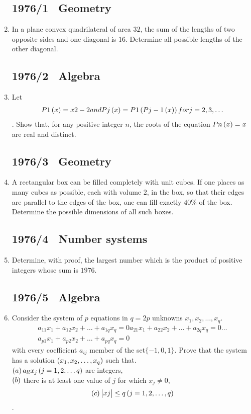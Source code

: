\documentclass{article}
\begin{document}
\begin{enumerate}
		\subsection*{1976/1 \ Geometry}
	\item In a plane convex quadrilateral of area $32$, the sum of the lengths of two opposite sides and one diagonal is $16$. Determine all possible lengths of the other diagonal.
\subsection*{1976/2 \ Algebra}
	\item Let\begin{align} P1\left(x\right) = x2 - 2 and Pj\left(x\right) = P1\left(Pj-1\left(x\right)\right) for j = 2, 3, \ldots \end{align}. Show that, for any positive integer $n$, the roots of the equation $Pn\left(x\right) = x$ are real and distinct.
\subsection*{1976/3 \ Geometry}
		\item A rectangular box can be filled completely with unit cubes. If one places as many cubes as possible, each with volume $2$, in the box, so that their edges are parallel to the edges of the box, one can fill exactly $40\%$ of the box. Determine the possible dimensions of all such boxes.
\subsection*{1976/4 \ Number systems}
		\item Determine, with proof, the largest number which is the product of positive integers whose sum is $1976$.
\subsection*{1976/5 \ Algebra}
		\item Consider the system of $p$ equations in $q = 2p$ unknowns $x_{1}, x_{2}, \ldots, x_{q} $.
			\begin{align}a_{11}x_{1} + a_{12}x_{2} +\ldots + a_{1q}x_{q} = 0 a_{21}x_{1} + a_{22}x_{2} +\ldots + a_{2q}x_{q}= 0 \ldots \\a_{p1}x_{1} + a_{p2}x_{2} + \ldots + a_{pq}x_{q} = 0\end{align} with every coefficient $a_{ij}$ member of the set$ \{-1, 0, 1\}$. Prove that the system has a solution $\left(x_{1}, x_{2},\ldots , x_{q}\right)$ such that.\\ $\left(a\right) a_{ll} x_{j} \left(j = 1, 2, \ldots q\right)$ are integers,\\ $\left(b\right)$ there is at least one value of $j$ for which $x_{j} \neq 0$,\begin{align} \left(c\right) \begin{vmatrix}xj\end{vmatrix} \leq q\left(j = 1, 2,\ldots, q\right)\end{align}.

\end{enumerate}
\end{document}
